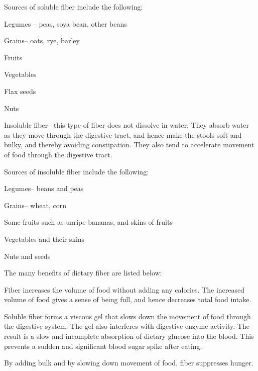 Sources of soluble fiber include the following:

 \item Legumes – peas, soya bean, other beans

 \item Grains– oats, rye, barley

 \item Fruits

 \item Vegetables

 \item Flax seeds

 \item Nuts


 \item 
 Insoluble fiber– this type of fiber does not dissolve in water. They absorb water as they move through the digestive tract, and hence make the stools soft and bulky, and thereby avoiding constipation. They also tend to accelerate movement of food through the digestive tract.

 Sources of insoluble fiber include the following:

 \item Legumes– beans and peas

 \item Grains– wheat, corn

 \item Some fruits such as unripe bananas, and skins of fruits

 \item Vegetables and their skins

 \item Nuts and seeds



The many benefits of dietary fiber are listed below:

\item Fiber increases the volume of food without adding any calories. The increased volume of food gives a sense of being full, and hence decreases total food intake.

 \item Soluble fiber forms a viscous gel that slows down the movement of food through the digestive system. The gel also interferes with digestive enzyme activity. The result is a slow and incomplete absorption of dietary glucose into the blood. This prevents a sudden and significant blood sugar spike after eating.

 \item By adding bulk and by slowing down movement of food, fiber suppresses hunger.

